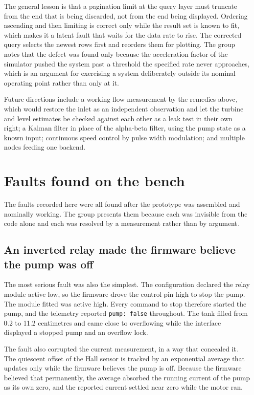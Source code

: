 The general lesson is that a pagination limit at the query layer must truncate from the end that is being discarded, not from the end being displayed. Ordering ascending and then limiting is correct only while the result set is known to fit, which makes it a latent fault that waits for the data rate to rise. The corrected query selects the newest rows first and reorders them for plotting. The group notes that the defect was found only because the acceleration factor of the simulator pushed the system past a threshold the specified rate never approaches, which is an argument for exercising a system deliberately outside its nominal operating point rather than only at it.

Future directions include a working flow measurement by the remedies above, which would restore the inlet as an independent observation and let the turbine and level estimates be checked against each other as a leak test in their own right; a Kalman filter in place of the alpha-beta filter, using the pump state as a known input; continuous speed control by pulse width modulation; and multiple nodes feeding one backend.

\section{Faults found on the bench}

The faults recorded here were all found after the prototype was assembled and nominally working. The group presents them because each was invisible from the code alone and each was resolved by a measurement rather than by argument.

\subsection{An inverted relay made the firmware believe the pump was off}

The most serious fault was also the simplest. The configuration declared the relay module active low, so the firmware drove the control pin high to stop the pump. The module fitted was active high. Every command to stop therefore started the pump, and the telemetry reported \texttt{pump: false} throughout. The tank filled from 0.2 to 11.2 centimetres and came close to overflowing while the interface displayed a stopped pump and an overflow lock.

The fault also corrupted the current measurement, in a way that concealed it. The quiescent offset of the Hall sensor is tracked by an exponential average that updates only while the firmware believes the pump is off. Because the firmware believed that permanently, the average absorbed the running current of the pump as its own zero, and the reported current settled near zero while the motor ran.

